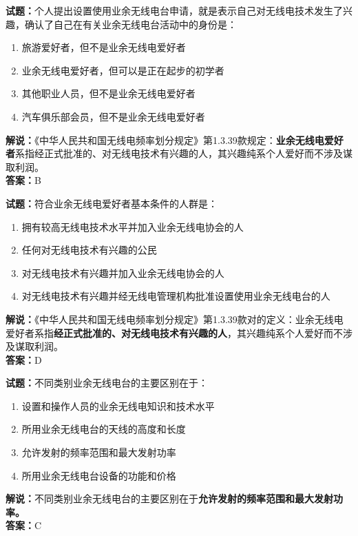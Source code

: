 \documentclass{ctexbook}
\begin{document}
\bigskip


\noindent\textbf{试题：}个人提出设置使用业余无线电台申请，就是表示自己对无线电技术发生了兴趣，确认了自己在有关业余无线电台活动中的身份是：
\begin{enumerate}[leftmargin=3em]
	\item 旅游爱好者，但不是业余无线电爱好者
	\item 业余无线电爱好者，但可以是正在起步的初学者
	\item 其他职业人员，但不是业余无线电爱好者
	\item 汽车俱乐部会员，但不是业余无线电爱好者
\end{enumerate}
\noindent\textbf{解说：}《中华人民共和国无线电频率划分规定》第1.3.39款规定：\textbf{业余无线电爱好者}系指经正式批准的、对无线电技术有兴趣的人，其兴趣纯系个人爱好而不涉及谋取利润。\\\noindent\textbf{答案：}B


\bigskip


\noindent\textbf{试题：}符合业余无线电爱好者基本条件的人群是：
\begin{enumerate}[leftmargin=3em]
	\item 拥有较高无线电技术水平并加入业余无线电协会的人
	\item 任何对无线电技术有兴趣的公民
	\item 对无线电技术有兴趣并加入业余无线电协会的人
	\item 对无线电技术有兴趣并经无线电管理机构批准设置使用业余无线电台的人
\end{enumerate}
\noindent\textbf{解说：}《中华人民共和国无线电频率划分规定》第1.3.39款对的定义：业余无线电爱好者系指\textbf{经正式批准的、对无线电技术有兴趣的人}，其兴趣纯系个人爱好而不涉及谋取利润。\\\noindent\textbf{答案：}D


\bigskip


\noindent\textbf{试题：}不同类别业余无线电台的主要区别在于：
\begin{enumerate}[leftmargin=3em]
	\item 设置和操作人员的业余无线电知识和技术水平
	\item 所用业余无线电台的天线的高度和长度
	\item 允许发射的频率范围和最大发射功率
	\item 所用业余无线电台设备的功能和价格
\end{enumerate}
\noindent\textbf{解说：}不同类别业余无线电台的主要区别在于\textbf{允许发射的频率范围和最大发射功率。}\\\noindent\textbf{答案：}C
\end{document}
